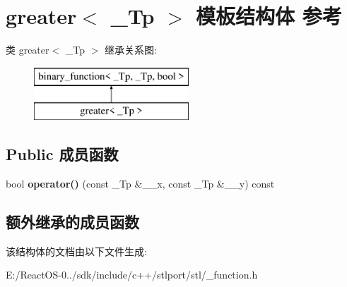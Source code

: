 \hypertarget{structgreater}{}\section{greater$<$ \+\_\+\+Tp $>$ 模板结构体 参考}
\label{structgreater}
类 greater$<$ \+\_\+\+Tp $>$ 继承关系图\+:\begin{figure}[H]
\begin{center}
\leavevmode
\includegraphics[height=2.000000cm]{structgreater}
\end{center}
\end{figure}
\subsection*{Public 成员函数}
\begin{DoxyCompactItemize}
\item 
\mbox{\label{structgreater_a21acb8b8f4fc5a1b69f151c69af455bb}} 
bool {\bfseries operator()} (const \+\_\+\+Tp \&\+\_\+\+\_\+x, const \+\_\+\+Tp \&\+\_\+\+\_\+y) const
\end{DoxyCompactItemize}
\subsection*{额外继承的成员函数}


该结构体的文档由以下文件生成\+:\begin{DoxyCompactItemize}
\item 
E\+:/\+React\+O\+S-\/0../sdk/include/c++/stlport/stl/\+\_\+function.\+h\end{DoxyCompactItemize}
